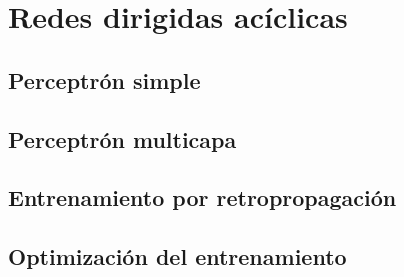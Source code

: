\documentclass[12pt,openany]{book}
\begin{document}
\part{Redes dirigidas acíclicas}
\chapter{Perceptrón simple}






\chapter{Perceptrón multicapa}




\chapter{Entrenamiento por retropropagación}








\chapter{Optimización del entrenamiento} 





\end{document}
